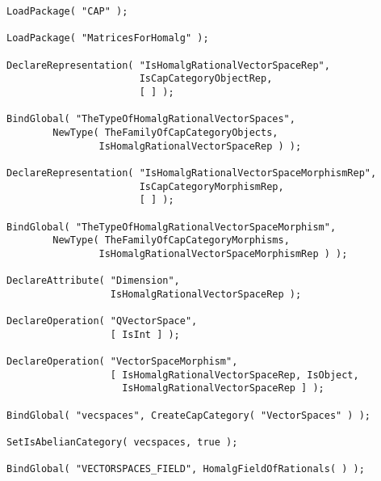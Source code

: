 \begin{small}
\begin{Verbatim}[frame=single]
LoadPackage( "CAP" );

LoadPackage( "MatricesForHomalg" );

DeclareRepresentation( "IsHomalgRationalVectorSpaceRep",
                       IsCapCategoryObjectRep,
                       [ ] );

BindGlobal( "TheTypeOfHomalgRationalVectorSpaces",
        NewType( TheFamilyOfCapCategoryObjects,
                IsHomalgRationalVectorSpaceRep ) );

DeclareRepresentation( "IsHomalgRationalVectorSpaceMorphismRep",
                       IsCapCategoryMorphismRep,
                       [ ] );

BindGlobal( "TheTypeOfHomalgRationalVectorSpaceMorphism",
        NewType( TheFamilyOfCapCategoryMorphisms,
                IsHomalgRationalVectorSpaceMorphismRep ) );

DeclareAttribute( "Dimension",
                  IsHomalgRationalVectorSpaceRep );

DeclareOperation( "QVectorSpace",
                  [ IsInt ] );

DeclareOperation( "VectorSpaceMorphism",
                  [ IsHomalgRationalVectorSpaceRep, IsObject,
                    IsHomalgRationalVectorSpaceRep ] );

BindGlobal( "vecspaces", CreateCapCategory( "VectorSpaces" ) );

SetIsAbelianCategory( vecspaces, true );

BindGlobal( "VECTORSPACES_FIELD", HomalgFieldOfRationals( ) );

\end{Verbatim}
\end{small}
